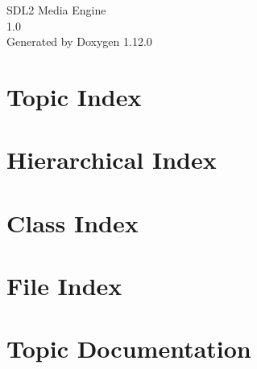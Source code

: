 \documentclass[twoside]{book}
\newcommand{\+}{\discretionary{\mbox{\scriptsize$\hookleftarrow$}}{}{}}
\newcommand{\clearemptydoublepage}{%
    \newpage{\pagestyle{empty}\cleardoublepage}%
  }
\begin{document}
  \raggedbottom
    \hypersetup{pageanchor=false,
                bookmarksnumbered=true,
                pdfencoding=unicode
               }
  \begin{titlepage}
  \vspace*{7cm}
  \begin{center}%
  {\Large SDL2 Media Engine}\\
  [1ex]\large 1.\+0 \\
  \vspace*{1cm}
  {\large Generated by Doxygen 1.12.0}\\
  \end{center}
  \end{titlepage}
  \clearemptydoublepage
  \tableofcontents
  \clearemptydoublepage
  \hypersetup{pageanchor=true}
\chapter{Topic Index}

\chapter{Hierarchical Index}

\chapter{Class Index}

\chapter{File Index}

\chapter{Topic Documentation}












\end{document}
